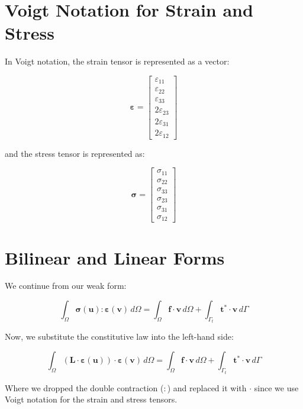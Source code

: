 \documentclass[
  11pt,
  a4paper,
]{scrbook}
\begin{document}
\section{Voigt Notation for Strain and
Stress}\label{voigt-notation-for-strain-and-stress}

In Voigt notation, the strain tensor is represented as a vector:

\[\boldsymbol{\varepsilon} = \begin{bmatrix}
\varepsilon_{11} \\ \varepsilon_{22} \\ \varepsilon_{33} \\ 2\varepsilon_{23} \\ 2\varepsilon_{31} \\ 2\varepsilon_{12} \end{bmatrix}\]

and the stress tensor is represented as:

\[\boldsymbol{\sigma} = \begin{bmatrix}
\sigma_{11} \\ \sigma_{22} \\ \sigma_{33} \\ \sigma_{23} \\ \sigma_{31} \\ \sigma_{12} \end{bmatrix}\]

\section{Bilinear and Linear Forms}\label{bilinear-and-linear-forms}

We continue from our weak form:

\[\int_{\Omega} \boldsymbol{\sigma}(\mathbf{u}) : \boldsymbol{\varepsilon}(\mathbf{v}) \, d\Omega = \int_{\Omega} \mathbf{f} \cdot \mathbf{v} \, d\Omega + \int_{\Gamma_t} \mathbf{t}^* \cdot \mathbf{v} \, d\Gamma\]

Now, we substitute the constitutive law into the left-hand side:

\[\int_{\Omega} (\boldsymbol{L}\cdot\boldsymbol{\varepsilon}(\mathbf{u})) \cdot \boldsymbol{\varepsilon}(\mathbf{v}) \, d\Omega = \int_{\Omega} \mathbf{f} \cdot \mathbf{v} \, d\Omega + \int_{\Gamma_t} \mathbf{t}^* \cdot \mathbf{v} \, d\Gamma\]

Where we dropped the double contraction (\(:\)) and replaced it with
\(\cdot\) since we use Voigt notation for the strain and stress tensors.
\end{document}
